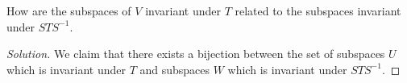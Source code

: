 \documentclass{article}
\newenvironment{solution}{\begin{proof}[Solution]}{\end{proof}}
\renewcommand\qedsymbol{$\blacksquare$}
\newenvironment{innerproof}{\renewcommand{\qedsymbol}{$\square$}\proof}{\endproof}
\begin{document}
	\begin{hw}
		How are the subspaces of $V$ invariant under $T$ related to the subspaces invariant under $STS^{-1}$.
	\end{hw}
	\begin{solution}
	\begin{comment}
			Let us suppose that for some subspace $U \subseteq V$, it is invariant under $STS^{-1}$. We claim then that $U$ is invariant under $T$ if and only if $U$ is invariant under $S$ as well.
		
		We will proceed with the forward direction. Let us suppose that $U$ is invariant under $T$. Then, we observe that we have the following:
		\begin{align*}
			STS^{-1}(Su) &= STu
		\end{align*}
	
		Then, we note that since $U$ is invariant under $T$, we have then that $Tu \in U$. Then, for $U$ to be invariant under $STS^{-1}$, we must have that $Su \in U$; in other words, $U$ is invariant under $S$.
		
		For the backwards direction, we will first introduce the following lemma:
		\begin{lem}
			For a finite-dimensional vector space $V$, let $S \in \mathcal L(V)$ be invertible. Then, for subspace $U$ which is invariant under $S$, $U$ is also invariant under $S^{-1}$
		\end{lem}
		\begin{innerproof}
			We observe that if $U$ is invariant under $S$, then $S(U) \subseteq U$.
			
			Furthermore, we note that since $S$ is invertible, then $\dim S(U) = \dim U$; so, we can conclude that $S(U) = U$.
			
			From here, observe that for any $u \in U$, we can write it as $T(w)$ for some $w \in U$. Then, we observe that $T^{-1}(u) = w$. In other words, we note that for any $u \in U$, we have $T^{-1}(u) \in U$ as well. Thus, $U$ must then be invariant under $S^{-1}$ as well.
		\end{innerproof}
	
		Now with this in mind, we observe that since $U$ is invariant (and invertible), it follows that $U$ is invariant under $S^{-1}$.
		
		Then, we observe that for some $u \in U$, we have:
		\begin{equation*}
			STS^{-1}u = STw,
		\end{equation*}
		where $w \in U$. Then, we note that for $U$ to be invariant under $STS^{-1}$, we must have that $Tw \in U$. And since $w$ is some vector in $U$ and $Tw \in U$ as well, we can conclude then that $U$ must also then be invariant under $T$ as well.
	\end{comment}
	We claim that there exists a bijection between the set of subspaces $U$ which is invariant under $T$ and subspaces $W$ which is invariant under $STS^{-1}$. 
	

\end{solution}
\end{document}
